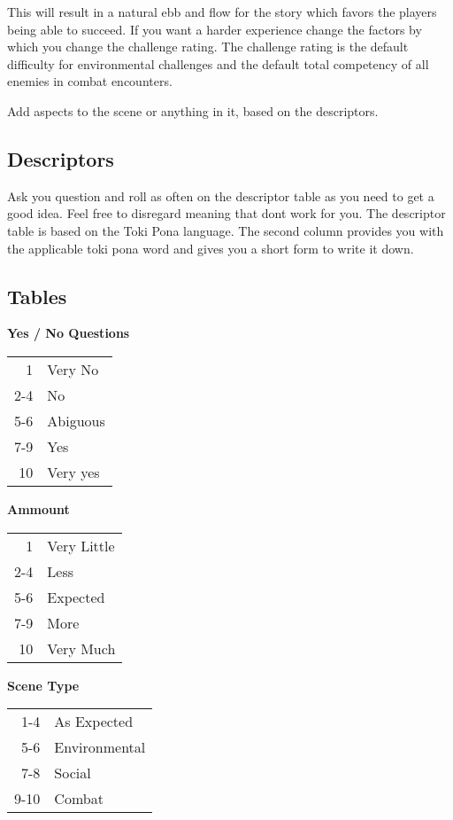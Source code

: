 \documentclass[11pt]{article}
\begin{document}
{This will result in a natural ebb and flow for the story which favors the players being able to succeed. If you want a harder experience change the factors by which you change the challenge rating. 
The challenge rating is the default difficulty for environmental challenges and the default total competency of all enemies in combat encounters.

Add aspects to the scene or anything in it, based on the descriptors.

\subsection{Descriptors}
\label{sec:org7ebb393}

Ask you question and roll as often on the descriptor table as you need to get a good idea. Feel free to disregard meaning that dont work for you.
The descriptor table is based on the Toki Pona language. The second column provides you with the applicable toki pona word and gives you a short form to write it down. 


\newpage
\subsection{Tables}
\label{sec:orgbbd7362}
\begin{multicols}{3}[]
\begin{center}
\textbf{Yes / No Questions}
\begin{center}
\begin{tabular}{rl}
1 & Very No\\[0pt]
2-4 & No\\[0pt]
5-6 & Abiguous\\[0pt]
7-9 & Yes\\[0pt]
10 & Very yes\\[0pt]
\end{tabular}
\end{center}
\columnbreak
\textbf{Ammount}
\begin{center}
\begin{tabular}{rl}
1 & Very Little\\[0pt]
2-4 & Less\\[0pt]
5-6 & Expected\\[0pt]
7-9 & More\\[0pt]
10 & Very Much\\[0pt]
\end{tabular}
\end{center}
\columnbreak
\textbf{Scene Type}
\begin{center}
\begin{tabular}{rl}
1-4 & As Expected\\[0pt]
5-6 & Environmental\\[0pt]
7-8 & Social\\[0pt]
9-10 & Combat\\[0pt]
\end{tabular}
\end{center}
\end{center}
\end{multicols}


}
\end{document}
